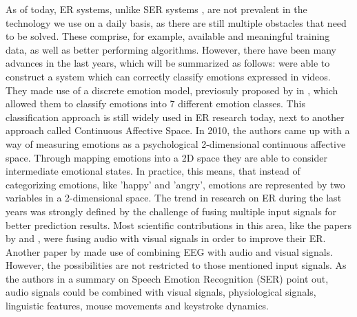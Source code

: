 \documentclass[11pt,a4paper]{scrbook}
\begin{document}
As of today, \gls{ER} systems, unlike \gls{SER} systems \citep{Akcay:2020:SpeechEmotionRecognition(SER)}, are not prevalent in the technology we use on a daily basis, as there are still multiple obstacles that need to be solved. These comprise, for example, available and meaningful training data, as well as better performing algorithms. However, there have been many advances in the last years, which will be summarized as follows: 
\newline\newline
\citet{Salah:2018:Video-BasedEmotionRec} were able to construct a system which can correctly classify emotions expressed in videos. They made use of a discrete emotion model, previosuly proposed by \citeauthor{Briesemeister:2011:DiscreteEmotion} in \citeyear{Briesemeister:2011:DiscreteEmotion}, which allowed them to classify emotions into 7 different emotion classes. 
\newline\newline
This classification approach is still widely used in \gls{ER} research today, next to another approach called Continuous Affective Space. In 2010, the authors \citet{Hupont:2010:FacialEmotionsIn2DAffectiveSpace} came up with a way of measuring emotions as a psychological 2-dimensional continuous affective space. Through mapping emotions into a 2D space they are able to consider intermediate emotional states. In practice, this means, that instead of categorizing emotions, like 'happy' and 'angry', emotions are represented by two variables in a 2-dimensional space.
\newline\newline
The trend in research on \gls{ER} during the last years was strongly defined by the challenge of fusing multiple input signals for better prediction results. Most scientific contributions in this area, like the papers by \citet{Yan:2016:MultiClueFusion} and \citet{Hossain:2019:AudioVisualER}, were fusing audio with visual signals in order to improve their \gls{ER}. Another paper by \citet{Xing:2019:EEGAudioVisual} made use of combining EEG with audio and visual signals. However, the possibilities are not restricted to those mentioned input signals. As the authors \citet{Akcay:2020:SpeechEmotionRecognition(SER)} in a summary on Speech Emotion Recognition (SER) point out, audio signals could be combined with visual signals, physiological signals, linguistic features, mouse movements and keystroke dynamics.
\newline\newline
\end{document}
